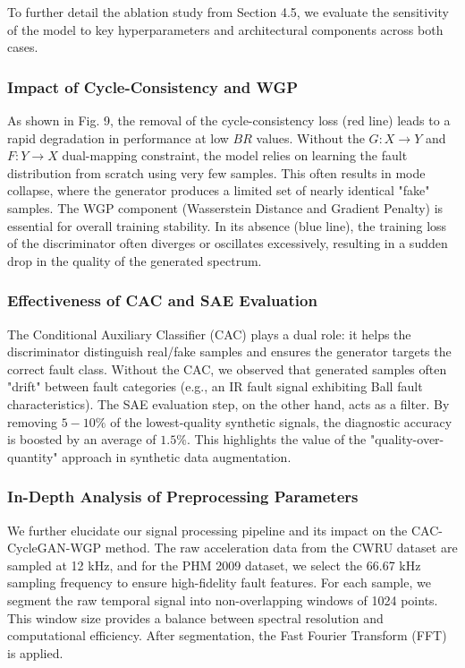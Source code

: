 To further detail the ablation study from Section 4.5, we evaluate the sensitivity of the model to key hyperparameters and architectural components across both cases.

\subsubsection{Impact of Cycle-Consistency and WGP}
As shown in Fig. 9, the removal of the cycle-consistency loss (red line) leads to a rapid degradation in performance at low $BR$ values. Without the $G: X \to Y$ and $F: Y \to X$ dual-mapping constraint, the model relies on learning the fault distribution from scratch using very few samples. This often results in mode collapse, where the generator produces a limited set of nearly identical "fake" samples. The WGP component (Wasserstein Distance and Gradient Penalty) is essential for overall training stability. In its absence (blue line), the training loss of the discriminator often diverges or oscillates excessively, resulting in a sudden drop in the quality of the generated spectrum.

\subsubsection{Effectiveness of CAC and SAE Evaluation}
The Conditional Auxiliary Classifier (CAC) plays a dual role: it helps the discriminator distinguish real/fake samples and ensures the generator targets the correct fault class. Without the CAC, we observed that generated samples often "drift" between fault categories (e.g., an IR fault signal exhibiting Ball fault characteristics). The SAE evaluation step, on the other hand, acts as a filter. By removing $5-10\%$ of the lowest-quality synthetic signals, the diagnostic accuracy is boosted by an average of $1.5\%$. This highlights the value of the "quality-over-quantity" approach in synthetic data augmentation.

\subsubsection{In-Depth Analysis of Preprocessing Parameters}
We further elucidate our signal processing pipeline and its impact on the CAC-CycleGAN-WGP method. The raw acceleration data from the CWRU dataset are sampled at 12 kHz, and for the PHM 2009 dataset, we select the 66.67 kHz sampling frequency to ensure high-fidelity fault features. For each sample, we segment the raw temporal signal into non-overlapping windows of 1024 points. This window size provides a balance between spectral resolution and computational efficiency. After segmentation, the Fast Fourier Transform (FFT) is applied. 

